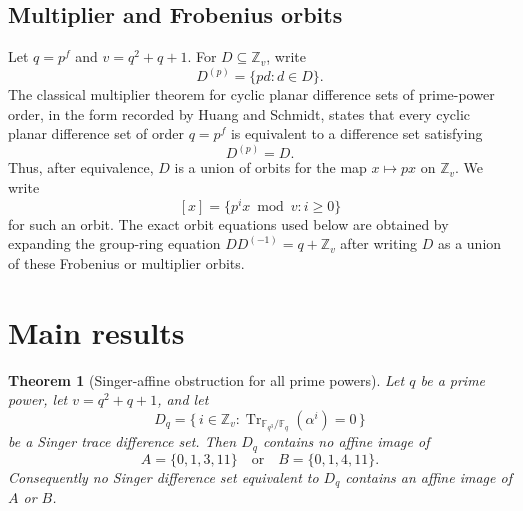 \documentclass[11pt,letterpaper]{amsart}
\theoremstyle{plain}
\newtheorem{theorem}{Theorem}[section]
\newcommand{\F}{\mathbb F}
\newcommand{\Z}{\mathbb Z}
\newcommand{\Tr}{\operatorname{Tr}}
\begin{document}
\subsection*{Multiplier and Frobenius orbits}

Let \(q=p^f\) and \(v=q^2+q+1\).  For \(D\subseteq \Z_v\), write
\[
 D^{(p)}=\{pd:d\in D\}.
\]
The classical multiplier theorem for cyclic planar difference sets of
prime-power order, in the form recorded by Huang and Schmidt, states
that every cyclic planar difference set of order \(q=p^f\) is equivalent
to a difference set satisfying
\[
 D^{(p)}=D.
\]
Thus, after equivalence, \(D\) is a union of orbits for the map
\(x\mapsto px\) on \(\Z_v\).  We write
\[
 [x]=\{p^i x\bmod v:i\geq 0\}
\]
for such an orbit.  The exact orbit equations used below are obtained
by expanding the group-ring equation \(DD^{(-1)}=q+\Z_v\) after writing
\(D\) as a union of these Frobenius or multiplier orbits.

\section{Main results}

\begin{theorem}[Singer-affine obstruction for all prime powers]
\label{thm:singer}
Let \(q\) be a prime power, let \(v=q^2+q+1\), and let
\[
 D_q=\{\,i\in \Z_v:\Tr_{\F_{q^3}/\F_q}(\alpha^i)=0\,\}
\]
be a Singer trace difference set.  Then \(D_q\) contains no affine image
of
\[
 A=\{0,1,3,11\}
 \quad\text{or}\quad
 B=\{0,1,4,11\}.
\]
Consequently no Singer difference set equivalent to \(D_q\) contains an
affine image of \(A\) or \(B\).
\end{theorem}
\end{document}
